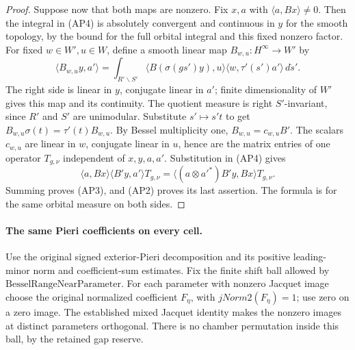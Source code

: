 \begin{proof}
Suppose now that both maps are nonzero. Fix \(x,a\)
with \(\langle a,Bx\rangle\ne0\). Then the integral
in (AP4) is absolutely convergent and continuous
in \(y\) for the smooth topology, by the bound for
the full orbital integral and this fixed nonzero
factor. For fixed \(w\in W',u\in W\), define a smooth
linear map \(B_{w,u}:H^\infty\to W'\) by
\[
 \langle B_{w,u}y,a'\rangle
   =\int_{R'\backslash S'}
       \langle B(\sigma(gs')y),u\rangle
                    \langle w,\tau'(s')a'\rangle\,d\dot s'.
\]
The right side is linear in \(y\), conjugate linear
in \(a'\); finite dimensionality of \(W'\) gives this
map and its continuity. The quotient measure is
right \(S'\)-invariant, since \(R'\) and \(S'\) are
unimodular. Substitute \(s'\mapsto s't\) to get
\(B_{w,u}\sigma(t)=\tau'(t)B_{w,u}\).
By Bessel multiplicity one,
\(B_{w,u}=c_{w,u}B'\). The scalars \(c_{w,u}\) are
linear in \(w\), conjugate linear in \(u\), hence
are the matrix entries of one operator \(T_{g,\nu}\)
independent of \(x,y,a,a'\).
Substitution in (AP4) gives
\[
 \langle a,Bx\rangle\langle B'y,a'\rangle T_{g,\nu}
       =\langle (a\otimes a'^*)B'y,Bx\rangle T_{g,\nu}.
\]
Summing proves (AP3), and (AP2) proves its last
assertion. The formula is for the same orbital
measure on both sides.
\end{proof}

\paragraph{The same Pieri coefficients on every cell.}
Use the original signed exterior-Pieri decomposition
and its positive leading-minor norm and coefficient-sum
estimates. Fix the finite shift ball allowed by
\(\mathrm{BesselRangeNearParameter}\).
For each parameter with nonzero Jacquet image choose
the original normalized coefficient \(F_\eta\), with
\(jNorm2(F_\eta)=1\); use zero on a zero image.
The established mixed Jacquet identity makes the
nonzero images at distinct parameters orthogonal.
There is no chamber permutation inside this ball,
by the retained gap reserve.

